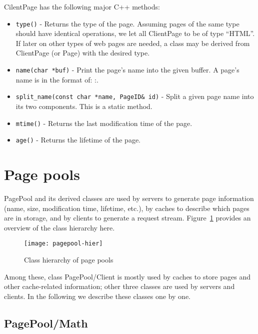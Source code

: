 CilentPage has the following major C++ methods: 

\begin{itemize}
\item {\tt type()} - Returns the type of the page. Assuming pages of
  the same type should have identical operations, we let all
  ClientPage to be of type ``HTML''. If later on other types of web
  pages are needed, a class may be derived from ClientPage (or Page)
  with the desired type. 
\item {\tt name(char *buf)} - Print the page's name into the given
  buffer. A page's name is in the format of:
  :. 
\item {\tt split\_name(const char *name, PageID\& id)} - Split a given
  page name into its two components. This is a static method. 
\item {\tt mtime()} - Returns the last modification time of the page.
\item {\tt age()} - Returns the lifetime of the page. 
\end{itemize}


\section{Page pools}
\label{sec:webcache-pagepool}

PagePool and its derived classes are used by servers to generate page
information (name, size, modification time, lifetime, etc.), by caches
to describe which pages are in storage, and by clients to generate a
request stream. Figure~\ref{fig:pagepool-hier} provides an overview of
the class hierarchy here. 

\begin{figure}[tb]
  \begin{center}
    \texttt{[image: pagepool-hier]}
    \caption{Class hierarchy of page pools}
    \label{fig:pagepool-hier}
  \end{center}
\end{figure}

Among these, class PagePool/Client is mostly used by caches to store
pages and other cache-related information; other three classes are
used by servers and clients. In the following we describe these
classes one by one.

\subsection{PagePool/Math}

